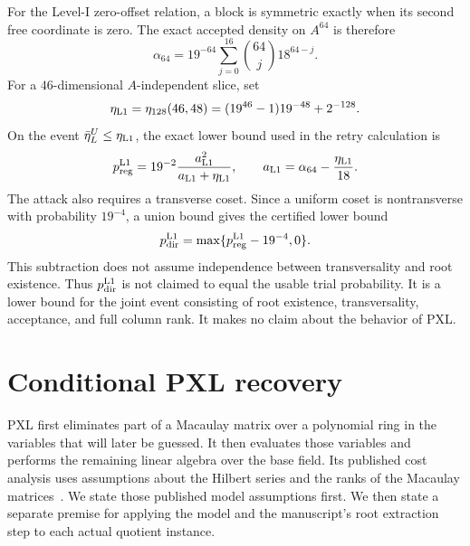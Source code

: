 For the Level-I zero-offset relation, a block is symmetric exactly when its
second free coordinate is zero.  The exact accepted density on $A^{64}$ is
therefore
\begin{equation}
 \alpha_{64}=19^{-64}\sum_{j=0}^{16}\binom{64}{j}18^{64-j}.
 \label{eq:pxl-alpha64}
\end{equation}
For a $46$-dimensional $A$-independent slice, set
\begin{equation}
 \eta_{\rm L1}=\eta_{128}(46,48)
 =(19^{46}-1)19^{-48}+2^{-128}.
 \label{eq:pxl-eta-level1}
\end{equation}
On the event $\bar\eta_L^U\le\eta_{\rm L1}$, the exact lower bound used in
the retry calculation is
\begin{equation}
 p_{\rm reg}^{\rm L1}
 =19^{-2}\frac{a_{\rm L1}^2}{a_{\rm L1}+\eta_{\rm L1}},
 \qquad
 a_{\rm L1}=\alpha_{64}-\frac{\eta_{\rm L1}}{18}.
 \label{eq:pxl-preg-level1}
\end{equation}
The attack also requires a transverse coset.  Since a uniform coset is
nontransverse with probability $19^{-4}$, a union bound gives the certified
lower bound
\begin{equation}
 p_{\rm dir}^{\rm L1}
 =\max\{p_{\rm reg}^{\rm L1}-19^{-4},0\}.
 \label{eq:pxl-pdir-level1}
\end{equation}
This subtraction does not assume independence between transversality and root
existence.  Thus $p_{\rm dir}^{\rm L1}$ is not claimed to equal the usable
trial probability.  It is a lower bound for the joint event consisting of
root existence, transversality, acceptance, and full column rank.  It makes no
claim about the behavior of PXL.

\section{Conditional PXL recovery}
\label{sec:pxl-conditional-recovery}

PXL first eliminates part of a Macaulay matrix over a polynomial ring in the
variables that will later be guessed.  It then evaluates those variables and
performs the remaining linear algebra over the base field.  Its published
cost analysis uses assumptions about the Hilbert series and the ranks of the
Macaulay matrices~\cite{FurueKudo2024PXL}.  We state those published model
assumptions first.  We then state a separate premise for applying the model
and the manuscript's root extraction step to each actual quotient instance.

